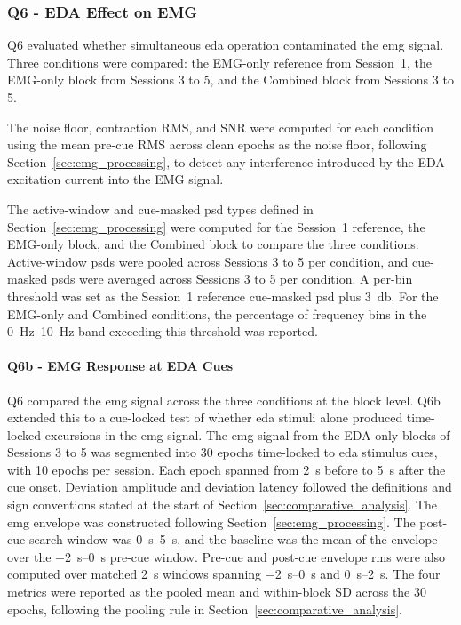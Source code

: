 \subsubsection{Q6 - EDA Effect on EMG}
\label{sec:q6_eda_effect_on_emg}
Q6 evaluated whether simultaneous \gls{eda} operation contaminated the \gls{emg} signal. Three conditions were compared: the EMG-only reference from Session~1, the EMG-only block from Sessions 3 to 5, and the Combined block from Sessions 3 to 5.

The noise floor, contraction RMS, and SNR were computed for each condition using the mean pre-cue RMS across clean epochs as the noise floor, following Section~\ref{sec:emg_processing}, to detect any interference introduced by the EDA excitation current into the EMG signal.

The active-window and cue-masked \gls{psd} types defined in Section~\ref{sec:emg_processing} were computed for the Session~1 reference, the EMG-only block, and the Combined block to compare the three conditions. Active-window \gls{psd}s were pooled across Sessions 3 to 5 per condition, and cue-masked \gls{psd}s were averaged across Sessions 3 to 5 per condition. A per-bin threshold was set as the Session~1 reference cue-masked \gls{psd} plus \SI{3}{\decibel}. For the EMG-only and Combined conditions, the percentage of frequency bins in the \SIrange{0}{10}{\hertz} band exceeding this threshold was reported.

\paragraph{Q6b - EMG Response at EDA Cues}
\label{sec:q6b_emg_at_eda_cues}
Q6 compared the \gls{emg} signal across the three conditions at the block level. Q6b extended this to a cue-locked test of whether \gls{eda} stimuli alone produced time-locked excursions in the \gls{emg} signal. The \gls{emg} signal from the EDA-only blocks of Sessions 3 to 5 was segmented into 30 epochs time-locked to \gls{eda} stimulus cues, with 10 epochs per session. Each epoch spanned from \SI{2}{\second} before to \SI{5}{\second} after the cue onset. Deviation amplitude and deviation latency followed the definitions and sign conventions stated at the start of Section~\ref{sec:comparative_analysis}. The \gls{emg} envelope was constructed following Section~\ref{sec:emg_processing}. The post-cue search window was \SIrange{0}{5}{\second}, and the baseline was the mean of the envelope over the \SIrange{-2}{0}{\second} pre-cue window. Pre-cue and post-cue envelope \gls{rms} were also computed over matched \SI{2}{\second} windows spanning \SIrange{-2}{0}{\second} and \SIrange{0}{2}{\second}. The four metrics were reported as the pooled mean and within-block SD across the 30 epochs, following the pooling rule in Section~\ref{sec:comparative_analysis}.

